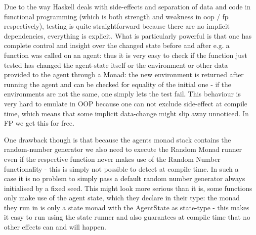 Due to the way Haskell deals with side-effects and separation of data and code in functional programming (which is both strength and weakness in oop / fp respectively), testing is quite straightforward because there are no implicit dependencies, everything is explicit. What is particularly powerful is that one has complete control and insight over the changed state before and after e.g. a function was called on an agent: thus it is very easy to check if the function just tested has changed the agent-state itself or the environment or other data provided to the agent through a Monad: the new environment is returned after running the agent and can be checked for equality of the initial one - if the environments are not the same, one simply lets the test fail. This behaviour is very hard to emulate in OOP because one can not exclude side-effect at compile time, which means that some implicit data-change might slip away unnoticed. In FP we get this for free.

One drawback though is that because the agents monad stack contains the random-number generator we also need to execute the Random Monad runner even if the respective function never makes use of the Random Number functionality - this is simply not possible to detect at compile time. In such a case it is no problem to simply pass a default random number generator always initialised by a fixed seed. This might look more serious than it is, some functions only make use of the agent state, which they declare in their type: the monad they run in is only a state monad with the AgentState as state-type - this makes it easy to run using the state runner and also guarantees at compile time that no other effects can and will happen.